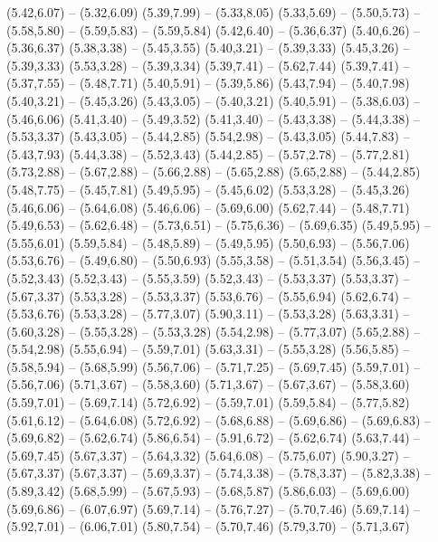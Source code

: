 {  (5.42,6.07) -- (5.32,6.09)
  (5.39,7.99) -- (5.33,8.05)
  (5.33,5.69) -- (5.50,5.73) -- (5.58,5.80) -- (5.59,5.83) -- (5.59,5.84)
  (5.42,6.40) -- (5.36,6.37)
  (5.40,6.26) -- (5.36,6.37)
  (5.38,3.38) -- (5.45,3.55)
  (5.40,3.21) -- (5.39,3.33)
  (5.45,3.26) -- (5.39,3.33)
  (5.53,3.28) -- (5.39,3.34)
  (5.39,7.41) -- (5.62,7.44)
  (5.39,7.41) -- (5.37,7.55) -- (5.48,7.71)
  (5.40,5.91) -- (5.39,5.86)
  (5.43,7.94) -- (5.40,7.98)
  (5.40,3.21) -- (5.45,3.26)
  (5.43,3.05) -- (5.40,3.21)
  (5.40,5.91) -- (5.38,6.03) -- (5.46,6.06)
  (5.41,3.40) -- (5.49,3.52)
  (5.41,3.40) -- (5.43,3.38) -- (5.44,3.38) -- (5.53,3.37)
  (5.43,3.05) -- (5.44,2.85)
  (5.54,2.98) -- (5.43,3.05)
  (5.44,7.83) -- (5.43,7.93)
  (5.44,3.38) -- (5.52,3.43)
  (5.44,2.85) -- (5.57,2.78) -- (5.77,2.81)
  (5.73,2.88) -- (5.67,2.88) -- (5.66,2.88) -- (5.65,2.88)
  (5.65,2.88) -- (5.44,2.85)
  (5.48,7.75) -- (5.45,7.81)
  (5.49,5.95) -- (5.45,6.02)
  (5.53,3.28) -- (5.45,3.26)
  (5.46,6.06) -- (5.64,6.08)
  (5.46,6.06) -- (5.69,6.00)
  (5.62,7.44) -- (5.48,7.71)
  (5.49,6.53) -- (5.62,6.48) -- (5.73,6.51) -- (5.75,6.36) -- (5.69,6.35)
  (5.49,5.95) -- (5.55,6.01)
  (5.59,5.84) -- (5.48,5.89) -- (5.49,5.95)
  (5.50,6.93) -- (5.56,7.06)
  (5.53,6.76) -- (5.49,6.80) -- (5.50,6.93)
  (5.55,3.58) -- (5.51,3.54)
  (5.56,3.45) -- (5.52,3.43)
  (5.52,3.43) -- (5.55,3.59)
  (5.52,3.43) -- (5.53,3.37)
  (5.53,3.37) -- (5.67,3.37)
  (5.53,3.28) -- (5.53,3.37)
  (5.53,6.76) -- (5.55,6.94)
  (5.62,6.74) -- (5.53,6.76)
  (5.53,3.28) -- (5.77,3.07)
  (5.90,3.11) -- (5.53,3.28)
  (5.63,3.31) -- (5.60,3.28) -- (5.55,3.28) -- (5.53,3.28)
  (5.54,2.98) -- (5.77,3.07)
  (5.65,2.88) -- (5.54,2.98)
  (5.55,6.94) -- (5.59,7.01)
  (5.63,3.31) -- (5.55,3.28)
  (5.56,5.85) -- (5.58,5.94) -- (5.68,5.99)
  (5.56,7.06) -- (5.71,7.25) -- (5.69,7.45)
  (5.59,7.01) -- (5.56,7.06)
  (5.71,3.67) -- (5.58,3.60)
  (5.71,3.67) -- (5.67,3.67) -- (5.58,3.60)
  (5.59,7.01) -- (5.69,7.14)
  (5.72,6.92) -- (5.59,7.01)
  (5.59,5.84) -- (5.77,5.82)
  (5.61,6.12) -- (5.64,6.08)
  (5.72,6.92) -- (5.68,6.88) -- (5.69,6.86) -- (5.69,6.83) -- (5.69,6.82) -- (5.62,6.74)
  (5.86,6.54) -- (5.91,6.72) -- (5.62,6.74)
  (5.63,7.44) -- (5.69,7.45)
  (5.67,3.37) -- (5.64,3.32)
  (5.64,6.08) -- (5.75,6.07)
  (5.90,3.27) -- (5.67,3.37)
  (5.67,3.37) -- (5.69,3.37) -- (5.74,3.38) -- (5.78,3.37) -- (5.82,3.38) -- (5.89,3.42)
  (5.68,5.99) -- (5.67,5.93) -- (5.68,5.87)
  (5.86,6.03) -- (5.69,6.00)
  (5.69,6.86) -- (6.07,6.97)
  (5.69,7.14) -- (5.76,7.27) -- (5.70,7.46)
  (5.69,7.14) -- (5.92,7.01) -- (6.06,7.01)
  (5.80,7.54) -- (5.70,7.46)
  (5.79,3.70) -- (5.71,3.67)
}
